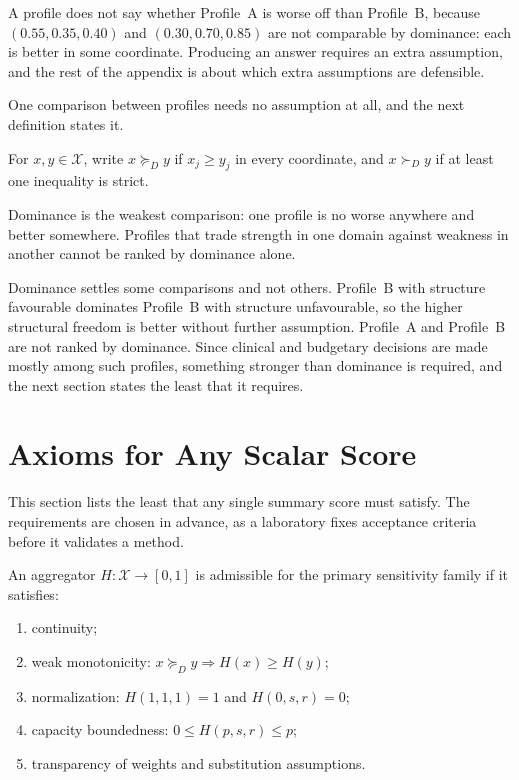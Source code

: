 \begin{reading}
A profile does not say whether Profile~A is worse off than Profile~B, because
$(0.55,0.35,0.40)$ and $(0.30,0.70,0.85)$ are not comparable by dominance: each is better in some coordinate. Producing an answer
requires an extra assumption, and the rest of the appendix is about which extra
assumptions are defensible.
\end{reading}

One comparison between profiles needs no assumption at all, and the next
definition states it.

\begin{definition}[Dominance]
For $x,y\in\mathcal X$, write $x\succeq_Dy$ if $x_j\ge y_j$ in every
coordinate, and $x\succ_Dy$ if at least one inequality is strict.
\end{definition}

\begin{remark}
Dominance is the weakest comparison: one profile is no worse anywhere and
better somewhere. Profiles that trade strength in one domain against weakness
in another cannot be ranked by dominance alone.
\end{remark}

Dominance settles some comparisons and not others. Profile~B with structure
favourable dominates Profile~B with structure unfavourable, so the higher
structural freedom is better without further assumption. Profile~A and
Profile~B are not ranked by dominance. Since clinical and budgetary decisions
are made mostly among such profiles, something stronger than dominance is
required, and the next section states the least that it requires.

\section{Axioms for Any Scalar Score}
\label{app:a-axioms}

This section lists the least that any single summary score must satisfy. The
requirements are chosen in advance, as a laboratory fixes acceptance criteria
before it validates a method.

\begin{definition}
An aggregator $H:\mathcal X\to[0,1]$ is admissible for the primary sensitivity
family if it satisfies:
\begin{enumerate}
 \item continuity;
 \item weak monotonicity: $x\succeq_Dy\Rightarrow H(x)\ge H(y)$;
 \item normalization: $H(1,1,1)=1$ and $H(0,s,r)=0$;
 \item capacity boundedness: $0\le H(p,s,r)\le p$;
 \item transparency of weights and substitution assumptions.
\end{enumerate}
\end{definition}

